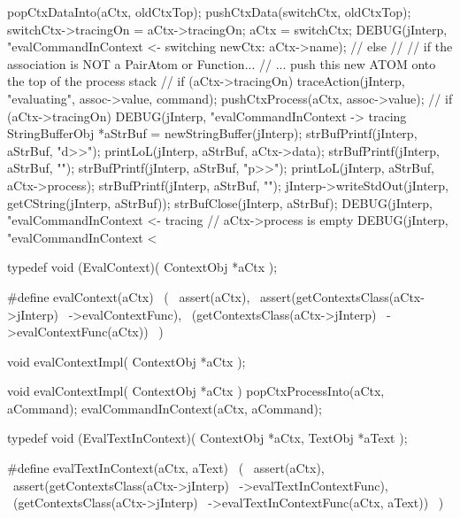{{{{        popCtxDataInto(aCtx, oldCtxTop);
        pushCtxData(switchCtx, oldCtxTop);
        switchCtx->tracingOn = aCtx->tracingOn;
        aCtx = switchCtx;
        DEBUG(jInterp, "evalCommandInContext <- switching newCtx: %
              aCtx->name);
        //
      } else {
        //
        // if the association is NOT a PairAtom or Function...
        // ... push this new ATOM onto the top of the process stack
        //
        if (aCtx->tracingOn)
          traceAction(jInterp, "evaluating", assoc->value, command);
        pushCtxProcess(aCtx, assoc->value);
        //
      }
    }
    if (aCtx->tracingOn) {
      DEBUG(jInterp, "evalCommandInContext -> tracing%
      StringBufferObj *aStrBuf = newStringBuffer(jInterp);
      strBufPrintf(jInterp, aStrBuf, "d>>");
      printLoL(jInterp, aStrBuf, aCtx->data);
      strBufPrintf(jInterp, aStrBuf, "\n");
      strBufPrintf(jInterp, aStrBuf, "p>>");
      printLoL(jInterp, aStrBuf, aCtx->process);
      strBufPrintf(jInterp, aStrBuf, "\n");
      jInterp->writeStdOut(jInterp, getCString(jInterp, aStrBuf));
      strBufClose(jInterp, aStrBuf);
      DEBUG(jInterp, "evalCommandInContext <- tracing%
    }
  } // aCtx->process is empty
  DEBUG(jInterp, "evalCommandInContext < %
}
\stopCCode

\startCHeader
typedef void (EvalContext)(
  ContextObj *aCtx
);

#define evalContext(aCtx)                   \
  (                                         \
    assert(aCtx),                           \
    assert(getContextsClass(aCtx->jInterp)  \
      ->evalContextFunc),                   \
    (getContextsClass(aCtx->jInterp)        \
      ->evalContextFunc(aCtx))              \
  )
\stopCHeader

\setCHeaderStream{private}
\startCHeader
void evalContextImpl(
  ContextObj *aCtx
);
\stopCHeader
{}

\startCCode
void evalContextImpl(
  ContextObj *aCtx
) {
  popCtxProcessInto(aCtx, aCommand);
  evalCommandInContext(aCtx, aCommand);
}
\stopCCode

\startCHeader
typedef void (EvalTextInContext)(
  ContextObj *aCtx,
  TextObj    *aText
);

#define evalTextInContext(aCtx, aText)      \
  (                                         \
    assert(aCtx),                           \
    assert(getContextsClass(aCtx->jInterp)  \
      ->evalTextInContextFunc),             \
    (getContextsClass(aCtx->jInterp)        \
      ->evalTextInContextFunc(aCtx, aText)) \
  )
\stopCHeader

